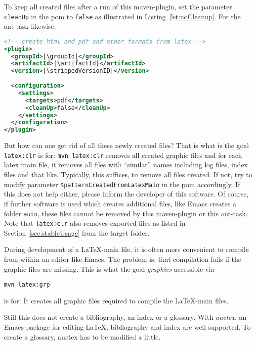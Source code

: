 To keep all created files after a run of this maven-plugin, 
set the parameter \texttt{cleanUp} in the pom 
to \texttt{false} as illustrated in Listing~\ref{lst:noCleanup}. 
For the ant-task likewise. 

\begin{lstlisting}[language=xml, basicstyle=\small,
escapechar=|,
float=b, captionpos=b, label={lst:noCleanup},
caption={Configuration without cleanup}]
<!-- create html and pdf and other formats from latex -->
<plugin>
  <groupId>|\groupId|</groupId>
  <artifactId>|\artifactId|</artifactId>
  <version>|\strippedVersionID|</version>
	
  <configuration>
    <settings>
      <targets>pdf</targets>
      <cleanUp>false</cleanUp>
    </settings>
  </configuration>
</plugin>
\end{lstlisting}


But how can one get rid of all these newly created files? 
That is what is the goal \texttt{latex:clr} is for: 
% 
\texttt{mvn latex:clr}
%
removes all created graphic files 
and for each latex main file, it removes all files with ``similar'' names
including log files, index files and that like.
Typically, this suffices, to remove all files created. 
If not, 
try to modify parameter \texttt{\$patternCreatedFromLatexMain} 
in the pom accordingly. 
If this does not help either, please inform the developer of this software. 
Of course, if further software is used which creates additional files, 
like Emacs creates a folder \texttt{auto}, 
these files cannot be removed by this maven-plugin or this ant-task.
Note that \texttt{latex:clr}
also removes exported files as listed in Section~\ref{sec:stableUsage}
from the target folder. 

During development of a \LaTeX-main file, 
it is often more convenient to compile from within an editor like Emacs. 
The problem is, that compilation fails if the graphic files are missing. 
This is what the goal {\em graphics\/} accessible via 
% 
\begin{Verbatim}
mvn latex:grp
\end{Verbatim}
%
is for: 
It creates all graphic files required to compile the \LaTeX-main files. 

Still this does not create a bibliography, an index or a glossary. 
With {\em auctex\/}, an Emacs-package for editing \LaTeX, 
bibliography and index are well supported. 
To create a glossary, auctex has to be modified a little. 

